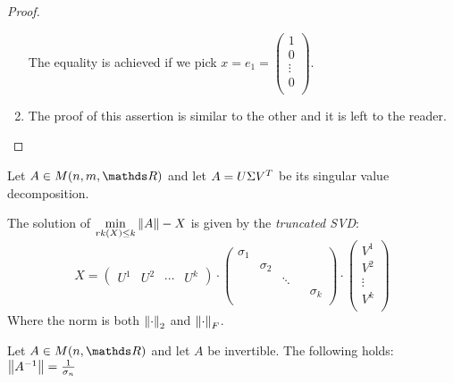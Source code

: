\documentclass[computationalMathematics.tex]{subfiles}
\begin{document}
\begin{proof}
\begin{enumerate}
  The equality is achieved if we pick $x = e_1 = \begin{pmatrix}
    1\\
    0\\
    \vdots\\
    0\\
  \end{pmatrix}$.
    \item The proof of this assertion is similar to the other and it is left to the reader.
    \end{enumerate}
\end{proof}

\begin{theorem}
  Let $A \in M(n, m, \R)$ and let $A = U \Sigma {V}^{T}$ be its singular value decomposition.

  The solution of $\min\limits_{rk(X) \le k} \left\lVert A\right\rVert-X$ is given by the \emph{truncated SVD}:
  \[
    X = \begin{pmatrix}
      U^1 & U^2 & \cdots & U^k
    \end{pmatrix}
    \cdot
    \begin{pmatrix}
    \sigma_1\\
    & \sigma_2\\
    && \ddots\\
    &&&& \sigma_k\\
    \end{pmatrix}
    \cdot
    \begin{pmatrix}
      V^1\\
      V^2\\
      \vdots\\
      V^k\\
    \end{pmatrix}
  \]
  Where the norm is both $\left\lVert\cdot\right\rVert_2$ and $\left\lVert\cdot\right\rVert_F$.
\end{theorem}

\begin{proposition}
  Let $A \in M(n, \R)$ and let $A$ be invertible. The following holds:
$  \left\lVert{A}^{-1}\right\rVert = \frac{1}{\sigma_n}$
\end{proposition}
\end{document}

